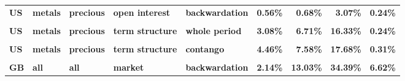 \documentclass[
  authoryear,
  preprint,
  3p]{elsarticle}
\begin{document}
\begin{landscape}
\begin{longtable}[t]{>{}l>{}l>{}l>{}l>{}l>{}r>{}r>{}r>{}r}
\textbf{US} & \textbf{metals} & \textbf{precious} & \textbf{open interest} & \textbf{backwardation} & \textcolor[HTML]{4285f4}{\textbf{0.56\%}} & \textcolor[HTML]{4285f4}{\textbf{0.68\%}} & \textcolor[HTML]{4285f4}{\textbf{3.07\%}} & \textcolor[HTML]{4285f4}{\textbf{0.24\%}}\\
\addlinespace
\textbf{\cellcolor{gray!10}{US}} & \textbf{\cellcolor{gray!10}{metals}} & \textbf{\cellcolor{gray!10}{precious}} & \textbf{\cellcolor{gray!10}{open interest}} & \textbf{\cellcolor{gray!10}{contango}} & \textcolor[HTML]{4285f4}{\textbf{\cellcolor{gray!10}{0.71\%}}} & \textcolor[HTML]{4285f4}{\textbf{\cellcolor{gray!10}{1.15\%}}} & \textcolor[HTML]{4285f4}{\textbf{\cellcolor{gray!10}{4.53\%}}} & \textcolor[HTML]{4285f4}{\textbf{\cellcolor{gray!10}{0.21\%}}}\\
\textbf{US} & \textbf{metals} & \textbf{precious} & \textbf{term structure} & \textbf{whole period} & \textcolor[HTML]{4285f4}{\textbf{3.08\%}} & \textcolor[HTML]{4285f4}{\textbf{6.71\%}} & \textcolor[HTML]{4285f4}{\textbf{16.33\%}} & \textcolor[HTML]{4285f4}{\textbf{0.24\%}}\\
\textbf{\cellcolor{gray!10}{US}} & \textbf{\cellcolor{gray!10}{metals}} & \textbf{\cellcolor{gray!10}{precious}} & \textbf{\cellcolor{gray!10}{term structure}} & \textbf{\cellcolor{gray!10}{backwardation}} & \textcolor[HTML]{4285f4}{\textbf{\cellcolor{gray!10}{1.79\%}}} & \textcolor[HTML]{4285f4}{\textbf{\cellcolor{gray!10}{6.21\%}}} & \textcolor[HTML]{4285f4}{\textbf{\cellcolor{gray!10}{14.69\%}}} & \textcolor[HTML]{4285f4}{\textbf{\cellcolor{gray!10}{0.39\%}}}\\
\textbf{US} & \textbf{metals} & \textbf{precious} & \textbf{term structure} & \textbf{contango} & \textcolor[HTML]{4285f4}{\textbf{4.46\%}} & \textcolor[HTML]{4285f4}{\textbf{7.58\%}} & \textcolor[HTML]{4285f4}{\textbf{17.68\%}} & \textcolor[HTML]{4285f4}{\textbf{0.31\%}}\\
\textbf{\cellcolor{gray!10}{GB}} & \textbf{\cellcolor{gray!10}{all}} & \textbf{\cellcolor{gray!10}{all}} & \textbf{\cellcolor{gray!10}{market}} & \textbf{\cellcolor{gray!10}{whole period}} & \textcolor[HTML]{4285f4}{\textbf{\cellcolor{gray!10}{1.74\%}}} & \textcolor[HTML]{4285f4}{\textbf{\cellcolor{gray!10}{11.71\%}}} & \textcolor[HTML]{4285f4}{\textbf{\cellcolor{gray!10}{33.71\%}}} & \textcolor[HTML]{4285f4}{\textbf{\cellcolor{gray!10}{10.75\%}}}\\
\addlinespace
\textbf{GB} & \textbf{all} & \textbf{all} & \textbf{market} & \textbf{backwardation} & \textcolor[HTML]{4285f4}{\textbf{2.14\%}} & \textcolor[HTML]{4285f4}{\textbf{13.03\%}} & \textcolor[HTML]{4285f4}{\textbf{34.39\%}} & \textcolor[HTML]{4285f4}{\textbf{6.62\%}}\\

\end{longtable}
\end{landscape}
\end{document}
